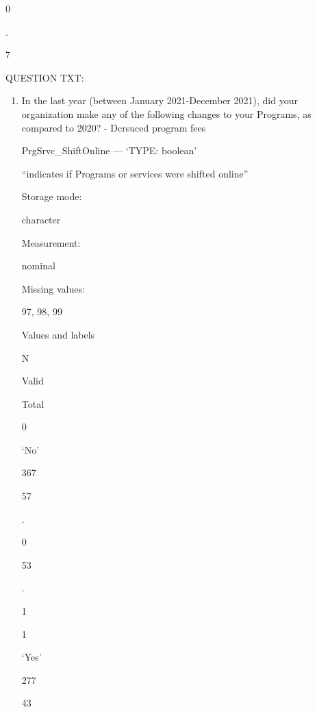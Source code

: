 \documentclass[
  letterpaper,
]{scrbook}
\providecommand{\tightlist}{%
  \setlength{\itemsep}{0pt}\setlength{\parskip}{0pt}}\usepackage{longtable,booktabs,array}
\begin{document}
\begin{enumerate}
\begin{enumerate}
\begin{enumerate}
\begin{enumerate}
\begin{enumerate}
\begin{enumerate}
\begin{enumerate}
\begin{enumerate}
\begin{enumerate}
\begin{enumerate}
                    0

                    .

                    7

                    QUESTION TXT:

                    \begin{enumerate}
                    \def\labelenumxi{\arabic{enumxi}.}
                    \tightlist
                    \item
                      In the last year (between January 2021-December
                      2021), did your organization make any of the
                      following changes to your Programs, as compared to
                      2020? - Dcrsuced program fees

                      PrgSrvc\_ShiftOnline --- {`TYPE: boolean'}

                      ``indicates if Programs or services were shifted
                      online''

                      Storage mode:

                      character

                      Measurement:

                      nominal

                      Missing values:

                      97, 98, 99

                      Values and labels

                      N

                      Valid

                      Total

                      0

                      `No'

                      367

                      57

                      .

                      0

                      53

                      .

                      1

                      1

                      `Yes'

                      277

                      43


\end{enumerate}
\end{enumerate}
\end{enumerate}
\end{enumerate}
\end{enumerate}
\end{enumerate}
\end{enumerate}
\end{enumerate}
\end{enumerate}
\end{enumerate}
\end{enumerate}
\end{document}
